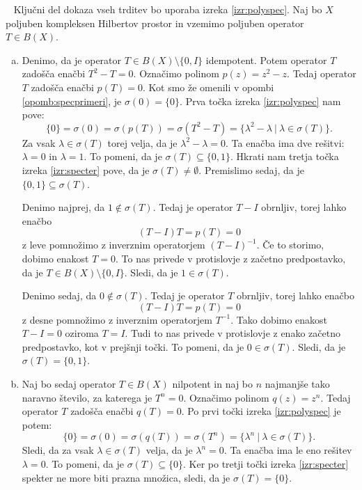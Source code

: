 \documentclass[12pt,a4paper,oneside,fleqn,openany]{book}
\newcommand{\eopf}{\raisebox{0.8ex}{\framebox{}}} %
\newenvironment{dokaz}%
{\noindent{\bf Dokaz.}\ }%
{\hfill\eopf\par\bigskip}%
\begin{document}
\begin{dokaz}
	Ključni del dokaza vseh trditev bo uporaba izreka \ref{izr:polyspec}. Naj bo $X$ poljuben kompleksen Hilbertov prostor in vzemimo poljuben operator $T\in B(X)$. \begin{enumerate}[a)]
		\item Denimo, da je operator $T\in B(X)\setminus\{0, I\}$ idempotent. Potem operator $T$ zadošča enačbi $T^2 - T = 0$. Označimo polinom $p(z) = z^2 - z$. Tedaj operator $T$ zadošča enačbi $p(T) = 0$. Kot smo že omenili v opombi \ref{opomb:specprimeri}, je $\sigma(0) = \{0\}$. Prva točka izreka \ref{izr:polyspec} nam pove: $$\{0\}=\sigma(0)=\sigma(p(T))=\sigma(T^2 - T) = \{\lambda^2 - \lambda~|~\lambda\in\sigma(T)\}.$$ Za vsak $\lambda\in\sigma(T)$ torej velja, da je $\lambda^2 - \lambda = 0$. Ta enačba ima dve rešitvi: $\lambda=0$ in $\lambda=1$. To pomeni, da je $\sigma(T)\subseteq\{0, 1\}$. Hkrati nam tretja točka izreka \ref{izr:specter} pove, da je $\sigma(T)\neq\emptyset$. Premislimo sedaj, da je $\{0, 1\}\subseteq\sigma(T)$.
		
		Denimo najprej, da $1\notin\sigma(T)$. Tedaj je operator $T- I$ obrnljiv, torej lahko enačbo $$(T-I)T = p(T) = 0$$ z leve pomnožimo z inverznim operatorjem $(T-I)^{-1}$. Če to storimo, dobimo enakost $T = 0$. To nas privede v protislovje z začetno predpostavko, da je $T\in B(X)\setminus\{0, I\}$. Sledi, da je $1\in\sigma(T)$.
		
		Denimo sedaj, da $0\notin\sigma(T)$. Tedaj je operator $T$ obrnljiv, torej lahko enačbo $$(T-I)T = p(T) = 0$$ z desne pomnožimo z inverznim operatorjem $T^{-1}$. Tako dobimo enakost $T-I = 0$ oziroma $T=I$. Tudi to nas privede v protislovje z enako začetno predpostavko, kot v prejšnji točki. To pomeni, da je $0\in\sigma(T)$. Sledi, da je $\sigma(T) = \{0, 1\}$.
		
		\item Naj bo sedaj operator $T\in B(X)$ nilpotent in naj bo $n$ najmanjše tako naravno število, za katerega je $T^n = 0$. Označimo polinom $q(z)=z^n$. Tedaj operator $T$ zadošča enačbi $q(T) = 0$. Po prvi točki izreka \ref{izr:polyspec} je potem: $$\{0\}=\sigma(0)=\sigma(q(T))=\sigma(T^n)=\{\lambda^n~|~\lambda\in\sigma(T)\}.$$ Sledi, da za vsak $\lambda\in\sigma(T)$ velja, da je $\lambda^n = 0$. Ta enačba ima le eno rešitev $\lambda=0$. To pomeni, da je $\sigma(T)\subseteq\{0\}$. Ker po tretji točki izreka \ref{izr:specter} spekter ne more biti prazna množica, sledi, da je $\sigma(T)=\{0\}$.
		

\end{enumerate}
\end{dokaz}
\end{document}
